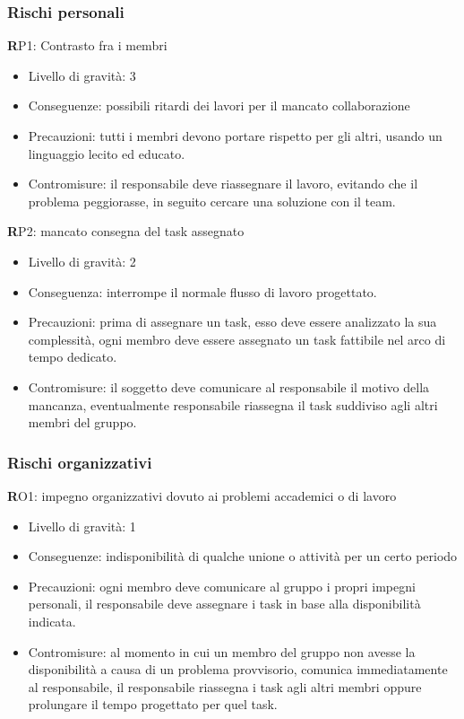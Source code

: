 \subsubsection{Rischi personali}
\textbf RP1: 
Contrasto fra i membri
\begin{itemize}
\item Livello di gravità: 3
\item Conseguenze: possibili ritardi dei lavori per il mancato collaborazione
\item Precauzioni: tutti i membri devono portare rispetto per gli altri, usando un linguaggio lecito ed educato.
\item Contromisure: il responsabile deve riassegnare il lavoro, evitando che il problema peggiorasse, in seguito cercare una soluzione con il team.
\end{itemize}
\textbf RP2:
mancato consegna del task assegnato
\begin{itemize}
\item Livello di gravità: 2
\item Conseguenza: interrompe il normale flusso di lavoro progettato.
\item Precauzioni: prima di assegnare un task, esso deve essere analizzato la sua complessità, ogni membro deve essere assegnato un task fattibile nel arco di tempo dedicato.
\item Contromisure: il soggetto deve comunicare al responsabile il motivo della mancanza, eventualmente responsabile riassegna il task suddiviso agli altri membri del gruppo.
\end{itemize}

\subsubsection{Rischi organizzativi}
\textbf RO1: 
impegno organizzativi dovuto ai problemi accademici o di lavoro
\begin{itemize}
\item Livello di gravità: 1
\item Conseguenze: indisponibilità di qualche unione o attività per un certo periodo
\item Precauzioni: ogni membro deve comunicare al gruppo i propri impegni personali, il responsabile deve assegnare i task in base alla disponibilità indicata.
\item Contromisure: al momento in cui un membro del gruppo non avesse la disponibilità a causa di un problema provvisorio, comunica immediatamente al responsabile, il responsabile riassegna i task agli altri membri oppure prolungare il tempo progettato per quel task.
\end{itemize}

